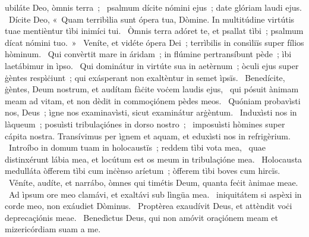 \psalmChapterWithInscription{}
{ }
{%
ubiláte Deo, òmnis terra~; 
~psalmum dícite nómini ejus~; date glóriam laudi ejus. 
~Dícite Deo, «~Quam terribìlia sunt ópera tua, Dòmine. In multitúdine virtútis tuae mentièntur tìbi inimíci tui. 
~Òmnis terra adóret te, et psallat tìbi~; psalmum dícat nómini tuo.~»
~Veníte, et vidéte ópera Dei~; terrìbilis in consìliïs super fílios hòminum. 
~Qui convèrtit mare in áridam~; in flúmine pertransíbunt pède~; ìbi laetábimur in ìpso. 
~Qui dominátur in virtúte sua in aetèrnum~; òculi ejus super ġèntes respìċiunt~; qui exásperant non exaltèntur in semet ìpsïs. 
~Benedícite, ġèntes, Deum nostrum, et audítam fàċite voċem laudis ejus, 
~qui pósuit ànimam meam ad vitam, et non dèdit in commoçiónem pèdes meos. 
~Quóniam probavìsti nos, Deus~; ìgne nos examinavìsti, sicut examinátur arġèntum. 
~Induxìsti nos in làqueum~; posuìsti tribulaçiónes in dorso nostro~; 
~imposuìsti hòmines super cápita nostra. Transívimus per ìgnem et aquam, et eduxìsti nos in refrigèrium. 
~Introíbo in domum tuam in holocaustïs~; reddem tìbi vota mea, 
~quae distinxérunt lábia mea, et locútum est os meum in tribulaçióne mea. 
~Holocausta medulláta òfferem tìbi cum inċènso aríetum~; òfferem tìbi boves cum hircïs. 
~Věníte, audíte, et narrábo, òmnes qui timétis Deum, quanta feċit ànimae meae. 
~Ad ìpsum ore meo clamávi, et exaltávi sub lìngüa mea. 
~iniquitátem si aspèxi in corde meo, non exáudiet Dòminus. 
~Proptèrea exaudívit Deus, et attèndit voċi deprecaçiónis meae. 
~Benedìctus Deus, qui non amóvit oraçiónem meam et mizericórdiam suam a me. 
}
